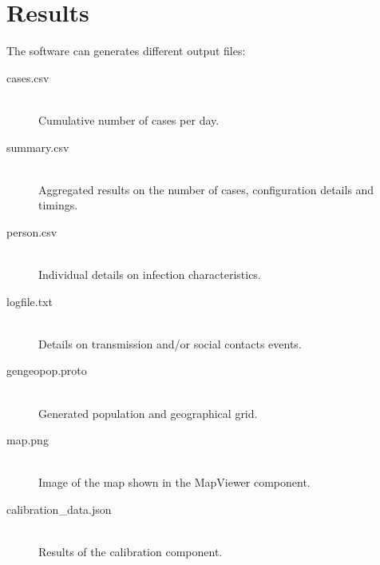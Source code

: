 \section{Results}
\label{section:Results}

The software can generates different output files:
\begin{description}
	\item [cases.csv] \ \\
	Cumulative number of cases per day.
	\item [summary.csv] \ \\
	Aggregated results on the number of cases, configuration details and timings.
	\item [person.csv] \ \\
	Individual details on infection characteristics.
	\item [logfile.txt] \ \\
	Details on transmission and/or social contacts events.
    \item [gengeopop.proto] \ \\
    Generated population and geographical grid.
    \item [map.png] \ \\
    Image of the map shown in the MapViewer component.
    \item [calibration\_data.json] \ \\
    Results of the calibration component.
\end{description}	
	
	
